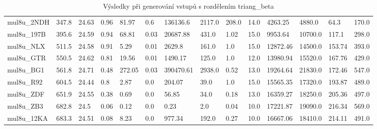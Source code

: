 \begin{landscape}
\begin{table}[!ht]
{\begin{tabular}{|l|l|l|l|l|l|l|l|l|l|l|l|l|l|}
        mul8u\_2NDH & 347.8 & 24.63 & 0.96 & 81.97 & 0.6 & 136136.6 & 2117.0 & 208.0 & 14.0 & 4263.25 & 4880.0 & 64.3 & 170.0 \\ 
        mul8u\_197B & 395.6 & 24.59 & 0.94 & 68.81 & 0.03 & 20687.88 & 431.0 & 1.02 & 15.0 & 9953.64 & 10700.0 & 117.1 & 298.0 \\ 
        mul8u\_NLX & 511.5 & 24.58 & 0.91 & 5.29 & 0.01 & 2629.8 & 161.0 & 1.0 & 15.0 & 12872.46 & 14500.0 & 153.74 & 393.0 \\ 
        mul8u\_GTR & 550.5 & 24.62 & 0.81 & 19.56 & 0.01 & 1490.17 & 125.0 & 1.0 & 12.0 & 13980.94 & 15520.0 & 167.76 & 429.0 \\ 
        mul8u\_BG1 & 561.8 & 24.71 & 0.48 & 272.05 & 0.03 & 390470.61 & 2938.0 & 0.52 & 13.0 & 19264.64 & 21830.0 & 172.46 & 547.0 \\ 
        mul8u\_R92 & 604.5 & 24.44 & 0.8 & 2.87 & 0.0 & 204.07 & 39.0 & 1.0 & 15.0 & 15565.35 & 17320.0 & 193.87 & 489.0 \\ 
        mul8u\_ZDF & 651.9 & 24.55 & 0.38 & 0.69 & 0.0 & 56.85 & 34.0 & 0.18 & 13.0 & 16359.27 & 18250.0 & 205.36 & 497.0 \\ 
        mul8u\_ZB3 & 682.8 & 24.5 & 0.06 & 0.12 & 0.0 & 0.23 & 2.0 & 0.04 & 10.0 & 17221.87 & 19090.0 & 216.34 & 569.0 \\ 
        mul8u\_12KA & 683.3 & 24.51 & 0.08 & 8.23 & 0.0 & 977.34 & 192.0 & 0.27 & 10.0 & 16667.06 & 18410.0 & 214.11 & 491.0 \\ 
    \end{tabular}}
    \caption{Výsledky při generování vstupů s rozdělením triang\_beta}
    \label{triang_beta}
\end{table}


\end{landscape}
